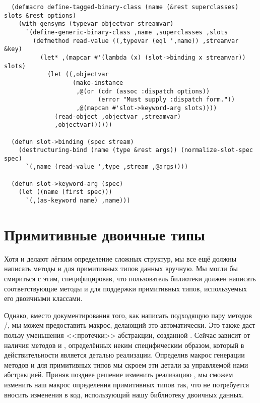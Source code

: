 \begin{lstlisting}
  (defmacro define-tagged-binary-class (name (&rest superclasses) slots &rest options)
    (with-gensyms (typevar objectvar streamvar)
      `(define-generic-binary-class ,name ,superclasses ,slots
        (defmethod read-value ((,typevar (eql ',name)) ,streamvar &key)
          (let* ,(mapcar #'(lambda (x) (slot->binding x streamvar)) slots)
            (let ((,objectvar
                   (make-instance 
                    ,@(or (cdr (assoc :dispatch options))
                          (error "Must supply :dispatch form."))
                    ,@(mapcan #'slot->keyword-arg slots))))
              (read-object ,objectvar ,streamvar)
              ,objectvar))))))

  (defun slot->binding (spec stream)
    (destructuring-bind (name (type &rest args)) (normalize-slot-spec spec)
      `(,name (read-value ',type ,stream ,@args))))

  (defun slot->keyword-arg (spec)
    (let ((name (first spec)))
      `(,(as-keyword name) ,name)))
\end{lstlisting}

\section{Примитивные двоичные типы}

Хотя  и  делают лёгким
определение сложных структур, мы все ещё должны написать методы  и
 для примитивных типов данных вручную. Мы могли бы смириться с этим,
специфицировав, что пользователь билиотеки должен написать соответствующие методы
 и  для поддержки примитивных типов, используемых его
двоичными классами.

Однако, вместо документирования того, как написать подходящую пару методов
/, мы можем предоставить макрос, делающий это
автоматически. Это также даст пользу уменьшения <<протечки>> абстракции, созданной
. Сейчас  зависит от наличия методов
 и , определённых неким специфическим образом, который
в действительности является деталью реализации. Определив макрос генерации методов
 и  для примитивных типов мы скроем эти детали за
управляемой нами абстракцией. Приняв позднее решение изменить реализацию
, мы сможем изменить наш макрос определения примитивных типов
так, что не потребуется вносить изменения в код, использующий нашу библиотеку двоичных
данных.

